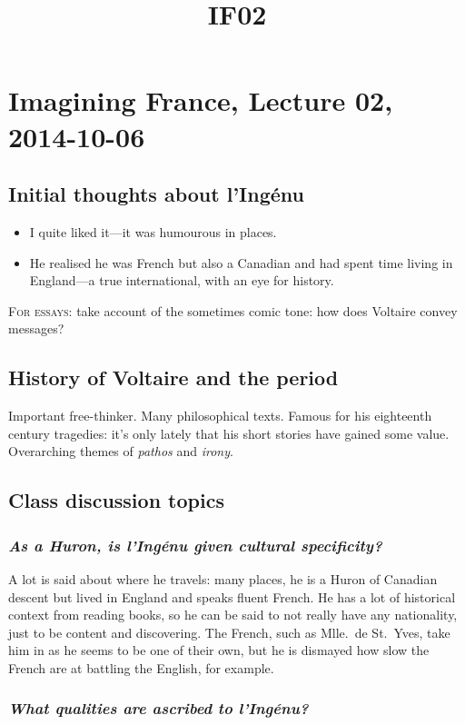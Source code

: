 \documentclass[12pt]{article}
\title{IF02}
\begin{document}
\section*{Imagining France, Lecture 02, 2014-10-06}

\subsection*{Initial thoughts about l'Ingénu}

\begin{itemize}
  \item{I quite liked it---it was humourous in places.}
  \item{He realised he was French but also a Canadian and had spent time living in England---a true international, with an eye for history.}
\end{itemize}

\textsc{For essays:} take account of the sometimes comic tone: how does Voltaire convey messages?

\subsection*{History of Voltaire and the period}

Important free-thinker. Many philosophical texts. Famous for his eighteenth century tragedies: it's only lately that his short stories have gained some value. Overarching themes of \textit{pathos} and \textit{irony}.

\subsection*{Class discussion topics}

\subsubsection*{\textit{As a Huron, is l'Ingénu given cultural specificity?}}

A lot is said about where he travels: many places, he is a Huron of Canadian descent but lived in England and speaks fluent French. He has a lot of historical context from reading books, so he can be said to not really have any nationality, just to be content and discovering. The French, such as Mlle.\ de St.\ Yves, take him in as he seems to be one of their own, but he is dismayed how slow the French are at battling the English, for example.

\subsubsection*{\textit{What qualities are ascribed to l'Ingénu?}}
\end{document}
